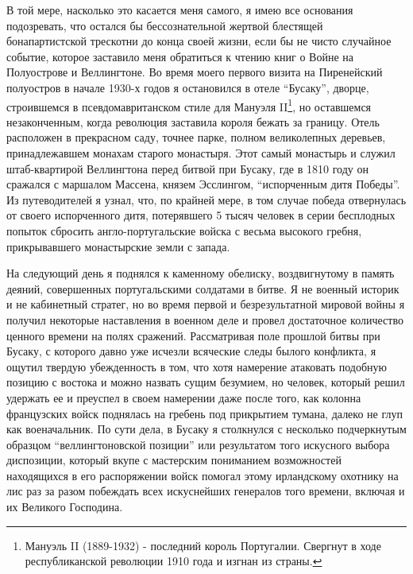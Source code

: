 \documentclass[
  oneside,
  12pt,
  titlepage]{book}
\begin{document}
В той мере, насколько это касается меня самого, я имею все основания подозревать, что остался бы бессознательной жертвой блестящей бонапартистской трескотни до конца своей жизни, если бы не чисто случайное событие, которое заставило меня обратиться к чтению книг о Войне на Полуострове и Веллингтоне. Во время моего первого визита на Пиренейский полуостров в начале 1930-х годов я остановился в отеле ``Бусаку'', дворце, строившемся в псевдомавританском стиле для Мануэля II\footnote{Мануэль II (1889-1932) - последний король Португалии. Свергнут в ходе республиканской революции 1910 года и изгнан из страны.}, но оставшемся незаконченным, когда революция заставила короля бежать за границу. Отель расположен в прекрасном саду, точнее парке, полном великолепных деревьев, принадлежавшем монахам старого монастыря. Этот самый монастырь и служил штаб-квартирой Веллингтона перед битвой при Бусаку, где в 1810 году он сражался с маршалом Массена, князем Эсслингом, ``испорченным дитя Победы''. Из путеводителей я узнал, что, по крайней мере, в том случае победа отвернулась от своего испорченного дитя, потерявшего 5 тысяч человек в серии бесплодных попыток сбросить англо-португальские войска с весьма высокого гребня, прикрывавшего монастырские земли с запада.

На следующий день я поднялся к каменному обелиску, воздвигнутому в память деяний, совершенных португальскими солдатами в битве. Я не военный историк и не кабинетный стратег, но во время первой и безрезультатной мировой войны я получил некоторые наставления в военном деле и провел достаточное количество ценного времени на полях сражений. Рассматривая поле прошлой битвы при Бусаку, с которого давно уже исчезли всяческие следы былого конфликта, я ощутил твердую убежденность в том, что хотя намерение атаковать подобную позицию с востока и можно назвать сущим безумием, но человек, который решил удержать ее и преуспел в своем намерении даже после того, как колонна французских войск поднялась на гребень под прикрытием тумана, далеко не глуп как военачальник. По сути дела, в Бусаку я столкнулся с несколько подчеркнутым образцом ``веллингтоновской позиции'' или результатом того искусного выбора диспозиции, который вкупе с мастерским пониманием возможностей находящихся в его распоряжении войск помогал этому ирландскому охотнику на лис раз за разом побеждать всех искуснейших генералов того времени, включая и их Великого Господина.
\end{document}
